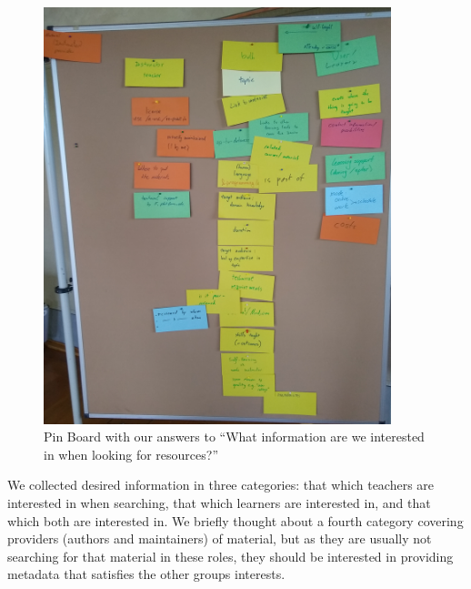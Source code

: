 \documentclass{scrartcl}
\begin{document}
\begin{figure}[h]
  \centering
  \includegraphics[width=0.9\textwidth]{metadata}
  \caption{Pin Board with our answers to “What information are we interested in when looking for resources?”}\label{fig:metadata}
\end{figure}

We collected desired information in three categories: that which teachers are interested in when searching, that which learners are interested in, and that which both are interested in.
We briefly thought about a fourth category covering providers (authors and maintainers) of material, but as they are usually not searching for that material in these roles, they should be interested in providing metadata that satisfies the other groups interests.
\end{document}
